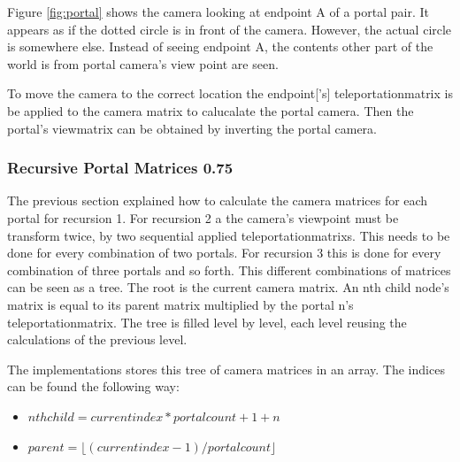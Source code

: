Figure \ref{fig:portal} shows the camera looking at endpoint A of a portal pair. It appears as if the dotted circle is in front of the camera. However, the actual circle is somewhere else. Instead of seeing endpoint A, the contents other part of the world is from portal camera's view point are seen.


To move the camera to the correct location the \gls{endpoint}['s] \gls{teleportationmatrix} is be applied to the camera matrix to calucalate the portal camera. Then the portal's \gls{viewmatrix} can be obtained by inverting the portal camera.






\subsubsection{Recursive Portal Matrices 0.75}
\label{section:recursivecameramatrices}
The previous section explained how to calculate the camera matrices for each portal for recursion 1. For recursion 2 a the camera's viewpoint must be transform twice, by two sequential applied \glspl{teleportationmatrix}. This needs to be done for every combination of two portals. For recursion 3 this is done for every combination of three portals and so forth. This different combinations of matrices can be seen as a tree. The root is the current camera matrix. An nth child node's matrix is equal to its parent matrix multiplied by the portal n's \gls{teleportationmatrix}. The tree is filled level by level, each level reusing the calculations of the previous level.




The implementations stores this tree of camera matrices in an array. The indices can be found the following way:

\begin{itemize}
	\item $ nth child = current index * portalcount + 1 + n$
	\item $ parent = \lfloor(current index-1)/portal count\rfloor $
\end{itemize}



